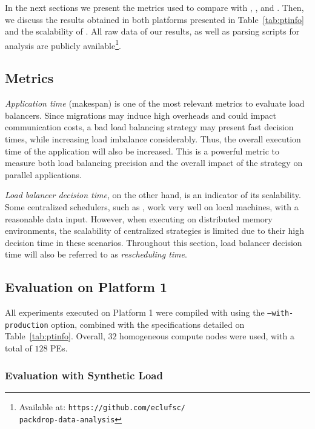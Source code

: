 In the next sections we present the metrics used to compare \packdrop with \greedylb, , \distributedlb and \dummylb.
Then, we discuss the results obtained in both platforms presented in Table~\ref{tab:ptinfo} and the scalability of \packdrop.
All raw data of our results, as well as parsing scripts for analysis are publicly available\footnote{Available at: \texttt{https://github.com/eclufsc/\\packdrop-data-analysis}}.

\subsection{Metrics}

\textit{Application time} (makespan) is one of the most relevant metrics to evaluate load balancers.
Since migrations may induce high overheads and could impact communication costs, a bad load balancing strategy may present fast decision times, while increasing load imbalance considerably. 
Thus, the overall execution time of the application will also be increased.
This is a powerful metric to measure both load balancing precision and the overall impact of the strategy on parallel applications.

\textit{Load balancer decision time}, on the other hand, is an indicator of its scalability.
Some centralized schedulers, such as \greedylb, work very well on local machines, with a reasonable data input.
However, when executing on distributed memory environments, the scalability of centralized strategies is limited due to their high decision time in these scenarios.
Throughout this section, load balancer decision time will also be referred to as \textit{rescheduling time}.

\subsection{Evaluation on Platform 1} \label{sec:cluster}

All experiments executed on Platform 1 were compiled with \charm using the {\small\texttt{--with-production}} option, combined with the specifications detailed on Table~\ref{tab:ptinfo}.
Overall, $32$ homogeneous compute nodes were used, with a total of $128$ PEs.

\subsubsection{Evaluation with Synthetic Load} \label{sec:cluster:lbtest}

